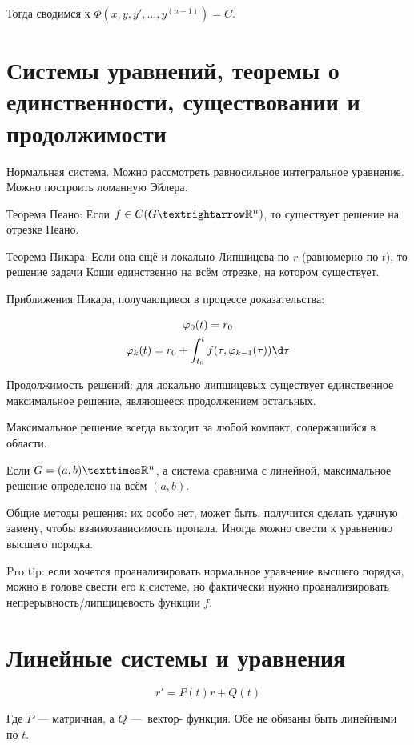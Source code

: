 \documentclass[12pt, a4paper]{article}
\begin{document}
Тогда сводимся к $\Phi(x, y, y', …, y^{(n - 1)}) = C$.



\section{Системы уравнений, теоремы о единственности, существовании и продолжимости}

Нормальная система. Можно рассмотреть равносильное интегральное уравнение. Можно построить ломанную Эйлера.

Теорема Пеано: Если $f \in C(G → \sR^n)$, то существует решение на отрезке Пеано.

Теорема Пикара: Если она ещё и локально Липшицева по $r$ (равномерно по $t$), 
то решение задачи Коши единственно на всём отрезке, на котором существует.

Приближения Пикара, получающиеся в процессе доказательства: 

\begin{gather}
    \varphi_0(t) = r_0 \\
    \varphi_k(t) = r_0 + \int_{t_0}^{t} f(\tau, \varphi_{k - 1}(\tau)) \d \tau
\end{gather}

Продолжимость решений: для локально липшицевых существует единственное максимальное решение, являющееся продолжением остальных.

Максимальное решение всегда выходит за любой компакт, содержащийся в области.

Если $G = (a, b) × \sR^n$, а система сравнима с линейной, максимальное решение определено на всём $(a, b)$.

Общие методы решения: их особо нет, может быть, получится сделать удачную замену, чтобы взаимозависимость пропала.
Иногда можно свести к уравнению высшего порядка.

Pro tip: если хочется проанализировать нормальное уравнение высшего порядка, можно в голове свести его к системе, 
но фактически нужно проанализировать непрерывность/липщицевость функции $f$.

\section{Линейные системы и уравнения}

\begin{equation}
    r' = P(t)r + Q(t)
\end{equation}

Где $P$ — матричная, а $Q$ — вектор- функция. Обе не обязаны быть линейными по $t$.
\end{document}
